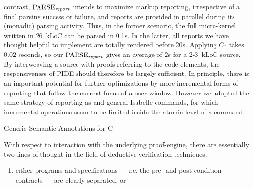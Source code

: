 \begin{isabellebody}
\begin{isamarkuptext}
contrast, $\text{PARSE}_{\text{\emph{report}}}$ intends to maximize markup reporting, irrespective
of a final parsing success or failure, and reports are provided in parallel during its (monadic)
parsing activity. Thus, in the former scenario, the full micro-kernel written in 26~kLoC can be
parsed in 0.1s. In the latter, all reports we have thought helpful to implement are totally rendered
before 20s. Applying $C^\downarrow$ takes 0.02 seconds, so our $\text{PARSE}_{\text{\emph{report}}}$
gives an average of 2s for a 2-3~kLoC source. By interweaving a source with proofs referring to the
code elements, the responsiveness of PIDE should therefore be largely sufficient. In principle,
there is an important potential for further optimizations by more incremental forms of reporting
that follow the current focus of a user window. However we adopted the same strategy of reporting as
 and general Isabelle commands, for which incremental operations
seem to be limited inside the atomic level of a command.%
\end{isamarkuptext}\isamarkuptrue%
%
\begin{isamarkupsection*}%
[label = {annotations},type = {scholarly_paper.technical}, args={label = {annotations},type = {scholarly_paper.technical}, scholarly_paper.text_section.main_author = {@{docitem ''fred''}}, Isa_COL.text_element.level = {}, Isa_COL.text_element.referentiable = {False}, Isa_COL.text_element.variants = {{STR ''outline'', STR ''document''}}, scholarly_paper.text_section.fixme_list = {}, Isa_COL.text_element.level = {}, scholarly_paper.technical.definition_list = {}}]Generic Semantic Annotations for C%
\end{isamarkupsection*}\isamarkuptrue%
%
\begin{isamarkuptext}%
With respect to interaction with the underlying proof-engine, there are essentially two
lines of thought in the field of deductive verification techniques:

%
\begin{enumerate}%
\item either programs and specifications --- i.e. the pre- and post-condition contracts --- are clearly 
separated, or


\end{enumerate}
\end{isamarkuptext}
\end{isabellebody}
